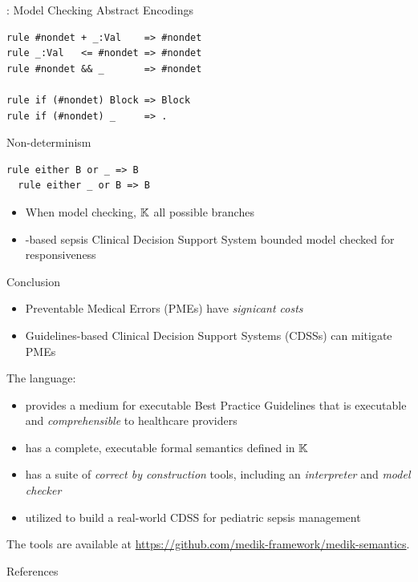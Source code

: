 \documentclass{beamer}
\begin{document}
\begin{frame}[fragile]{\MediK{}: Model Checking}
Abstract Encodings
\begin{lstlisting}[language=k,style=ksty,basicstyle=\ttfamily\tiny]
rule #nondet + _:Val    => #nondet
rule _:Val   <= #nondet => #nondet
rule #nondet && _       => #nondet

rule if (#nondet) Block => Block
rule if (#nondet) _     => .
\end{lstlisting}
\pause
Non-determinism
\begin{lstlisting}[language=medik,style=mediksty,basicstyle=\ttfamily\tiny]
  rule either B or _ => B
  rule either _ or B => B
\end{lstlisting}
\pause
\begin{itemize}
  \item When model checking, $\mathbb{K}{}$ all possible branches
  \item \MediK{}-based sepsis Clinical Decision Support System bounded model checked
    for responsiveness
\end{itemize}
\end{frame}
\begin{frame}{Conclusion}
\begin{itemize}
  \item Preventable Medical Errors (PMEs) have \emph{signicant costs}
  \item Guidelines-based Clinical Decision Support Systems (CDSSs) can mitigate PMEs
\end{itemize}
  \pause
  The \MediK{} language:
\begin{itemize}
  \item provides a medium for executable Best Practice Guidelines that is
    \alert{executable} and \emph{comprehensible} to healthcare providers
  \item has a complete, executable formal semantics defined in $\mathbb{K}{}$
  \item has a suite of \emph{correct by construction} tools, including
    an \emph{interpreter} and \emph{model checker}
  \item utilized to build a real-world CDSS for pediatric sepsis management
\end{itemize}
\begin{tiny}
  The \MediK{} tools are available at \url{https://github.com/medik-framework/medik-semantics}.
\end{tiny}

\end{frame}


\begin{frame}[allowframebreaks]{References}
  
\end{frame}
\end{document}
